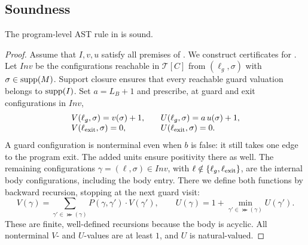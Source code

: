 \subsection{Soundness}

\begin{theorem}[Soundness]
\label{thm:soundness}
The program-level AST rule in  is sound.
\end{theorem}
\begin{proof}
Assume that $I,v,u$ satisfy all premises of .
We construct certificates for .
Let $\mathit{Inv}$ be the configurations
reachable in $\mathcal T[C]$ from $(\ell_g,\sigma)$ with
$\sigma\in\textnormal{supp}(M)$. Support closure ensures that every reachable
guard valuation belongs to $\textnormal{supp}(I)$. Set $a=L_B+1$ and prescribe,
at guard and exit configurations in $\mathit{Inv}$,
\[
 \begin{array}{@{}l@{\qquad}l@{}}
 V(\ell_g,\sigma)=v(\sigma)+1,
   &U(\ell_g,\sigma)=a\,u(\sigma)+1,\\
 V(\ell_{\rm exit},\sigma)=0,
   &U(\ell_{\rm exit},\sigma)=0.
 \end{array}
\]
A guard configuration is nonterminal even when $b$ is false: it still
takes one edge to the program exit. The added units ensure positivity
there as well.
The remaining configurations $\gamma=(\ell,\sigma)\in\mathit{Inv}$,
with $\ell\notin\{\ell_g,\ell_{\rm exit}\}$, are the internal body
configurations, including the body entry. There we define both functions
by backward recursion, stopping at the next guard visit:
\begin{equation}
 V(\gamma)=\sum_{\gamma'\in\Succ(\gamma)}
                  P(\gamma,\gamma')\cdot V(\gamma'),
 \qquad
 U(\gamma)=1+\min_{\gamma'\in\Succ(\gamma)}U(\gamma').
 \label{eq:lift-recursion}
\end{equation}
These are finite, well-defined recursions because the body
is acyclic. All nonterminal $V$- and $U$-values are at least $1$, and
$U$ is natural-valued.


\end{proof}
